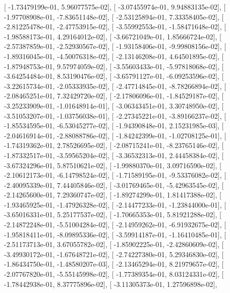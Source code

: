 \documentclass{article}
\begin{document}
       [ -1.73479199e-01,   5.96077575e-02],
       [ -3.07455974e-01,   9.94883135e-02],
       [ -1.97708908e-01,  -7.83651148e-02],
       [ -2.53125894e-01,   7.33358405e-02],
       [ -2.81225478e-01,  -2.47753915e-02],
       [ -3.55992553e-01,  -1.58471648e-02],
       [ -1.98588173e-01,   4.29164012e-02],
       [ -3.66721049e-01,   1.85666724e-02],
       [ -2.57387859e-01,  -2.52930567e-02],
       [ -1.93158406e-01,  -9.99808156e-02],
       [ -1.89316045e-01,  -4.50076318e-02],
       [ -2.13146208e-01,   4.64501895e-02],
       [ -1.87948753e-01,   9.57974059e-02],
       [ -3.55603433e-01,  -5.97818068e-02],
       [ -3.64254484e-01,   8.53190476e-02],
       [ -3.65791127e-01,  -6.09253596e-02],
       [ -3.22615734e-01,  -2.05333935e-02],
       [ -2.47714845e-01,  -8.78266894e-02],
       [ -2.08465251e-01,   7.32429720e-02],
       [ -2.17806096e-01,  -1.84529187e-02],
       [ -3.25233909e-01,  -1.01648914e-01],
       [ -3.06343451e-01,   3.30748950e-02],
       [ -3.51053207e-01,  -1.03756038e-01],
       [ -2.27345221e-01,  -3.89166237e-02],
       [ -1.85534595e-01,  -6.53045277e-02],
       [ -1.94390848e-01,   2.15231985e-03],
       [ -2.04616914e-01,  -2.88088786e-02],
       [ -1.84242399e-01,  -1.02708125e-01],
       [ -1.74319362e-01,   2.78526695e-02],
       [ -2.08715241e-01,  -8.23765146e-02],
       [ -1.87332517e-01,  -3.59565204e-02],
       [ -3.36532313e-01,   2.44458384e-02],
       [ -3.67324296e-01,   5.87510621e-02],
       [ -1.99880370e-01,   3.09716590e-02],
       [ -2.10612173e-01,  -6.14798524e-02],
       [ -1.71589195e-01,  -9.53376082e-02],
       [ -2.40095339e-01,   7.44405846e-02],
       [ -3.01769465e-01,  -5.42963545e-02],
       [ -2.14265600e-01,   7.29360747e-02],
       [ -1.89274299e-01,   1.81417388e-02],
       [ -1.93465925e-01,  -1.47926328e-02],
       [ -2.14477233e-01,  -1.23844000e-01],
       [ -3.65016331e-01,   5.25177537e-02],
       [ -1.70665353e-01,   5.81921288e-02],
       [ -2.14872248e-01,  -5.51004284e-02],
       [ -2.14959262e-01,  -6.91932675e-02],
       [ -1.95818411e-01,  -8.09895336e-02],
       [ -3.59914187e-01,  -1.16410485e-01],
       [ -2.51173713e-01,   3.67055782e-02],
       [ -1.85902225e-01,  -2.42860609e-02],
       [ -3.49930172e-01,  -1.67648721e-02],
       [ -2.74227380e-01,   5.29346830e-02],
       [ -1.86434750e-01,  -1.48580207e-03],
       [ -2.13465294e-01,   8.21979657e-02],
       [ -2.07767820e-01,  -5.55145998e-02],
       [ -1.77389354e-01,   8.03124331e-02],
       [ -1.78442938e-01,   8.37775896e-02],
       [ -3.11305373e-01,   1.27596898e-02],
\end{document}
